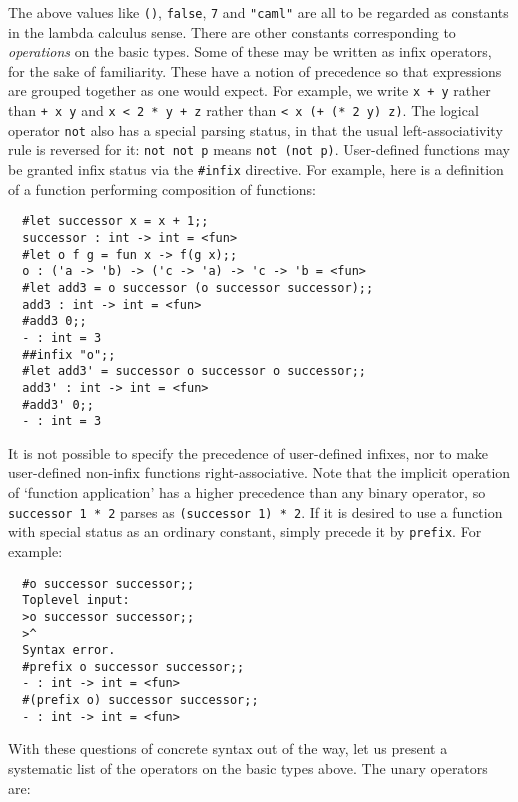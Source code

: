 The above values like {\tt ()}, {\tt false}, {\tt 7} and \lstinline!"caml"! are all
to be regarded as constants in the lambda calculus sense. There are other
constants corresponding to {\em operations} on the basic types. Some of these
may be written as infix operators, for the sake of familiarity. These have a
notion of precedence so that expressions are grouped together as one would
expect. For example, we write {\tt x + y} rather than {\tt + x y} and {\tt x <
2 * y + z} rather than {\tt < x (+ (* 2 y) z)}. The logical operator {\tt not}
also has a special parsing status, in that the usual left-associativity rule is
reversed for it: {\tt not not p} means {\tt not (not p)}. User-defined
functions may be granted infix status via the {\tt \#infix} directive. For
example, here is a definition of a function performing composition of
functions:

\begin{boxed}\begin{lstlisting}
  #let successor x = x + 1;;
  successor : int -> int = <fun>
  #let o f g = fun x -> f(g x);;
  o : ('a -> 'b) -> ('c -> 'a) -> 'c -> 'b = <fun>
  #let add3 = o successor (o successor successor);;
  add3 : int -> int = <fun>
  #add3 0;;
  - : int = 3
  ##infix "o";;
  #let add3' = successor o successor o successor;;
  add3' : int -> int = <fun>
  #add3' 0;;
  - : int = 3
\end{lstlisting}\end{boxed}

It is not possible to specify the precedence of user-defined infixes, nor to
make user-defined non-infix functions right-associative. Note that the implicit
operation of `function application' has a higher precedence than any binary
operator, so {\tt successor 1 * 2} parses as {\tt (successor 1) * 2}. If it is
desired to use a function with special status as an ordinary constant, simply
precede it by {\tt prefix}. For example:

\begin{boxed}\begin{verbatim}
  #o successor successor;;
  Toplevel input:
  >o successor successor;;
  >^
  Syntax error.
  #prefix o successor successor;;
  - : int -> int = <fun>
  #(prefix o) successor successor;;
  - : int -> int = <fun>
\end{verbatim}\end{boxed}

With these questions of concrete syntax out of the way, let us present a
systematic list of the operators on the basic types above. The unary operators
are:

